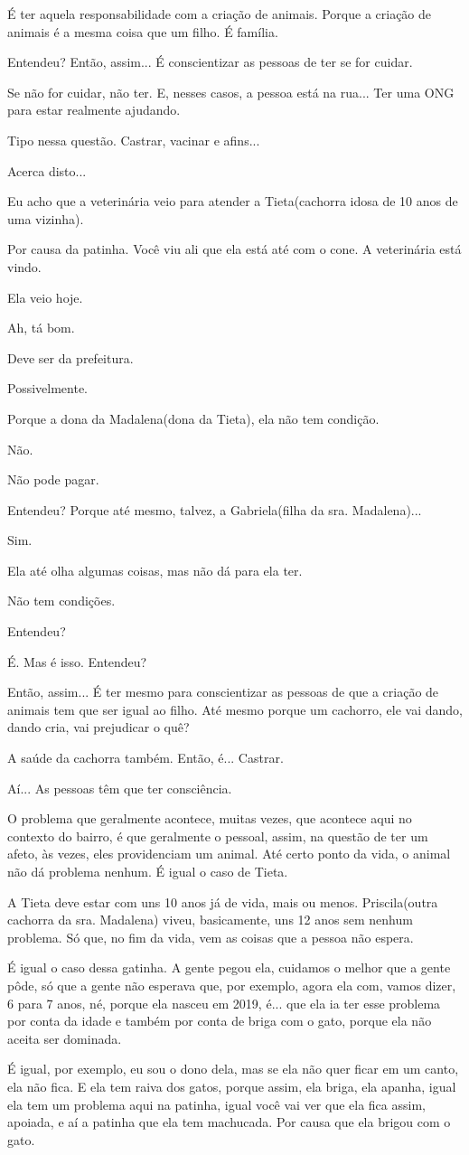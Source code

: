 \documentclass[12pt,a4paper]{article}
\newenvironment{turnos}{\begin{list}{}{\setlength{\leftmargin}{2.2cm}\setlength{\labelwidth}{2.0cm}\setlength{\labelsep}{0.2cm}\setlength{\itemsep}{0.45em}\setlength{\parsep}{0pt}}}{\end{list}}
\newcommand{\fala}[1]{\item[\textbf{#1}\hfill]}
\begin{document}
\begin{turnos}
\fala{G:} É ter aquela responsabilidade com a criação de animais. Porque a criação de animais é a mesma coisa que um filho. É família.
\fala{G:} Entendeu? Então, assim... É conscientizar as pessoas de ter se for cuidar.
\fala{G:} Se não for cuidar, não ter. E, nesses casos, a pessoa está na rua... Ter uma ONG para estar realmente ajudando.
\fala{G:} Tipo nessa questão. Castrar, vacinar e afins...
\fala{A:} Acerca disto...
\fala{A:} Eu acho que a veterinária veio para atender a Tieta(cachorra idosa de 10 anos de uma vizinha).
\fala{A:} Por causa da patinha. Você viu ali que ela está até com o cone. A veterinária está vindo.
\fala{A:} Ela veio hoje.
\fala{E:} Ah, tá bom.
\fala{A:} Deve ser da prefeitura.
\fala{E:} Possivelmente.
\fala{A:} Porque a dona da Madalena(dona da Tieta), ela não tem condição.
\fala{E:} Não.
\fala{A:} Não pode pagar.
\fala{E:} Entendeu? Porque até mesmo, talvez, a Gabriela(filha da sra. Madalena)... 
\fala{A:} Sim.
\fala{E:} Ela até olha algumas coisas, mas não dá para ela ter.
\fala{A:} Não tem condições.
\fala{E:} Entendeu?
\fala{A:} É. Mas é isso. Entendeu?
\fala{G:} Então, assim... É ter mesmo para conscientizar as pessoas de que a criação de animais tem que ser igual ao filho. Até mesmo porque um cachorro, ele vai dando, dando cria, vai prejudicar o quê?
\fala{G:} A saúde da cachorra também. Então, é... Castrar.
\fala{G:} Aí... As pessoas têm que ter consciência.
\fala{E:} O problema que geralmente acontece, muitas vezes, que acontece aqui no contexto do bairro, é que geralmente o pessoal, assim, na questão de ter um afeto, às vezes, eles providenciam um animal. Até certo ponto da vida, o animal não dá problema nenhum. É igual o caso de Tieta.
\fala{E:} A Tieta deve estar com uns 10 anos já de vida, mais ou menos. Priscila(outra cachorra da sra. Madalena) viveu, basicamente, uns 12 anos sem nenhum problema. Só que, no fim da vida, vem as coisas que a pessoa não espera.
\fala{E:} É igual o caso dessa gatinha. A gente pegou ela, cuidamos o melhor que a gente pôde, só que a gente não esperava que, por exemplo, agora ela com, vamos dizer, 6 para 7 anos, né, porque ela nasceu em 2019, é... que ela ia ter esse problema por conta da idade e também por conta de briga com o gato, porque ela não aceita ser dominada.
\fala{E:} É igual, por exemplo, eu sou o dono dela, mas se ela não quer ficar em um canto, ela não fica. E ela tem raiva dos gatos, porque assim, ela briga, ela apanha, igual ela tem um problema aqui na patinha, igual você vai ver que ela fica assim, apoiada, e aí a patinha que ela tem machucada. Por causa que ela brigou com o gato.

\end{turnos}
\end{document}
